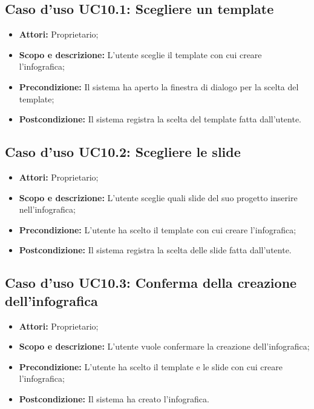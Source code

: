 \subsection{Caso d'uso UC10.1: Scegliere un template}
\begin{itemize}
	\item \textbf{Attori:} Proprietario;
	\item \textbf{Scopo e descrizione:} L'utente sceglie il template con cui creare l'infografica;
	\item \textbf{Precondizione:} Il sistema ha aperto la finestra di dialogo per la scelta del template;
	\item \textbf{Postcondizione:} Il sistema registra la scelta del template fatta dall'utente.
\end{itemize}


\subsection{Caso d'uso UC10.2: Scegliere le slide}
\begin{itemize}
\item \textbf{Attori:} Proprietario;
\item \textbf{Scopo e descrizione:} L'utente sceglie quali slide del suo progetto inserire nell'infografica;
\item \textbf{Precondizione:} L'utente ha scelto il template con cui creare l'infografica;
\item \textbf{Postcondizione:} Il sistema registra la scelta delle slide fatta dall'utente.
\end{itemize}


\subsection{Caso d'uso UC10.3: Conferma della creazione dell'infografica}
\begin{itemize}
\item \textbf{Attori:} Proprietario;
\item \textbf{Scopo e descrizione:} L'utente vuole confermare la creazione dell'infografica;
\item \textbf{Precondizione:} L'utente ha scelto il template e le slide con cui creare l'infografica;
\item \textbf{Postcondizione:} Il sistema ha creato l'infografica.
\end{itemize}
